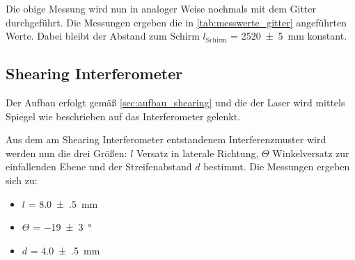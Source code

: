 \documentclass[ngerman]{scrartcl}
\begin{document}
Die obige Messung wird nun in analoger Weise nochmals mit dem Gitter durchgeführt. Die Messungen ergeben die in \autoref{tab:messwerte_gitter} angeführten Werte. Dabei bleibt der Abstand zum Schirm $l_\text{Schirm}$ = \SI{2520(5)}{\milli\meter} konstant.

\subsection{Shearing Interferometer}
\label{sec:durchfuehrung_shearing}
Der Aufbau erfolgt gemäß \autoref{sec:aufbau_shearing} und die der Laser wird mittels Spiegel wie beschrieben auf das Interferometer gelenkt. 

Aus dem am Shearing Interferometer entstandenem Interferenzmuster wird werden nun die drei Größen: $l$ Versatz in laterale Richtung, $\Theta$ Winkelversatz zur einfallenden Ebene und der Streifenabstand $d$ bestimmt. Die Messungen ergeben sich zu: 
\begin{itemize}
    \item $l$ = \SI{8.0(5)}{\milli\meter}
    \item $\Theta$ = \SI{-19(3)}{\degree}
    \item $d$ = \SI{4.0(5)}{\milli\meter}
\end{itemize}
\end{document}
